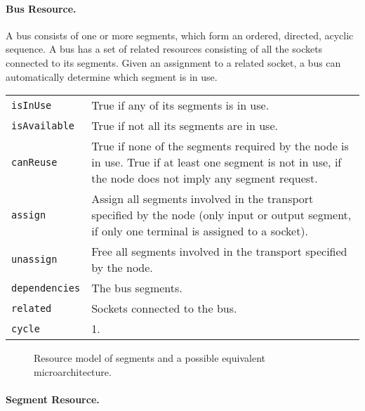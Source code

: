 \documentclass[a4paper,twoside]{tce}
\begin{document}
\paragraph{Bus Resource.}

A bus consists of one or more segments, which form an ordered, directed,
acyclic sequence. A bus has a set of related resources consisting of all the
sockets connected to its segments. Given an assignment to a related socket,
a bus can automatically determine which segment is in use.

\begin{flushleft}
\begin{tabular*}{\textwidth}[h]{|l|@{\extracolsep{\fill}}p{}|}
  \hline
  \texttt{isInUse} &
  True if any of its segments is in use.\\
  \texttt{isAvailable} &
  True if not all its segments are in use.\footnotemark\\
  \texttt{canReuse} &
  True if none of the segments required by the node is in use. True if at
  least one segment is not in use, if the node does not imply any segment
  request.\\
  \texttt{assign} &
  Assign all segments involved in the transport specified by the node (only
  input or output segment, if only one terminal is assigned to a socket).\\
  \texttt{unassign} &
  Free all segments involved in the transport specified by the node.\\
  \texttt{dependencies} &
  The bus segments.\\
  \texttt{related} &
  Sockets connected to the bus.\\
  \texttt{cycle} &
  1.\\
  \hline
\end{tabular*}
\end{flushleft}
%

\begin{figure}[tb]
\centerline{}
\caption{Resource model of segments and a possible equivalent
  microarchitecture.}
  \label{fig:segment-model}
\end{figure}

\paragraph{Segment Resource.}
\end{document}
